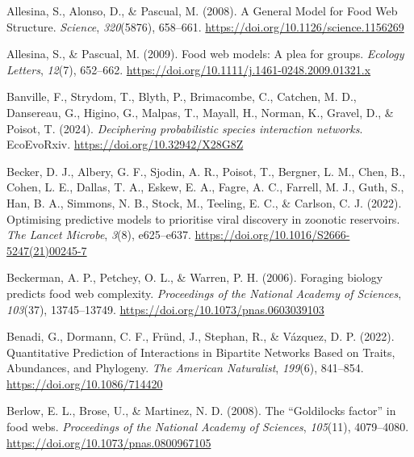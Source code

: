 \documentclass[
]{article}
\newlength{\cslhangindent}
\newenvironment{CSLReferences}[2] %
 {\begin{list}{}{%
  \setlength{\itemindent}{0pt}
  \setlength{\leftmargin}{0pt}
  \setlength{\parsep}{0pt}
  \ifodd #1
   \setlength{\leftmargin}{\cslhangindent}
   \setlength{\itemindent}{-1\cslhangindent}
  \fi
  \setlength{\itemsep}{#2\baselineskip}}}
 {\end{list}}
\begin{document}
\label{refs}
\begin{CSLReferences}{1}{0}
Allesina, S., Alonso, D., \& Pascual, M. (2008). A {General Model} for
{Food Web Structure}. \emph{Science}, \emph{320}(5876), 658--661.
\url{https://doi.org/10.1126/science.1156269}

Allesina, S., \& Pascual, M. (2009). Food web models: A plea for groups.
\emph{Ecology Letters}, \emph{12}(7), 652--662.
\url{https://doi.org/10.1111/j.1461-0248.2009.01321.x}

Banville, F., Strydom, T., Blyth, P., Brimacombe, C., Catchen, M. D.,
Dansereau, G., Higino, G., Malpas, T., Mayall, H., Norman, K., Gravel,
D., \& Poisot, T. (2024). \emph{Deciphering probabilistic species
interaction networks}. EcoEvoRxiv. \url{https://doi.org/10.32942/X28G8Z}

Becker, D. J., Albery, G. F., Sjodin, A. R., Poisot, T., Bergner, L. M.,
Chen, B., Cohen, L. E., Dallas, T. A., Eskew, E. A., Fagre, A. C.,
Farrell, M. J., Guth, S., Han, B. A., Simmons, N. B., Stock, M.,
Teeling, E. C., \& Carlson, C. J. (2022). Optimising predictive models
to prioritise viral discovery in zoonotic reservoirs. \emph{The Lancet
Microbe}, \emph{3}(8), e625--e637.
\url{https://doi.org/10.1016/S2666-5247(21)00245-7}

Beckerman, A. P., Petchey, O. L., \& Warren, P. H. (2006). Foraging
biology predicts food web complexity. \emph{Proceedings of the National
Academy of Sciences}, \emph{103}(37), 13745--13749.
\url{https://doi.org/10.1073/pnas.0603039103}

Benadi, G., Dormann, C. F., Fründ, J., Stephan, R., \& Vázquez, D. P.
(2022). Quantitative {Prediction} of {Interactions} in {Bipartite
Networks Based} on {Traits}, {Abundances}, and {Phylogeny}. \emph{The
American Naturalist}, \emph{199}(6), 841--854.
\url{https://doi.org/10.1086/714420}

Berlow, E. L., Brose, U., \& Martinez, N. D. (2008). The {``{Goldilocks}
factor''} in food webs. \emph{Proceedings of the National Academy of
Sciences}, \emph{105}(11), 4079--4080.
\url{https://doi.org/10.1073/pnas.0800967105}


\end{CSLReferences}
\end{document}
